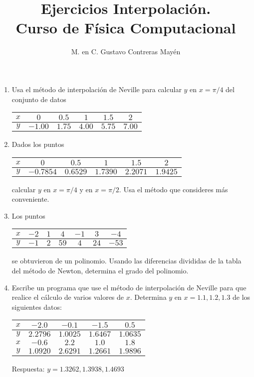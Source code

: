 \documentclass[11pt]{article}
\title{Ejercicios Interpolaci\'{o}n. \\ Curso de Física Computacional}
\author{M. en C. Gustavo Contreras Mayén}
\date{ }
\begin{document}
\maketitle
\fontsize{14}{14}\selectfont
\begin{enumerate}
\item Usa el m\'{e}todo de interpolaci\'{o}n de Neville para calcular $y$ en $x=\pi/4$ del conjunto de datos
\begin{table}[htbp]
\centering 
\begin{tabulary}{15cm}{c | c | c | c | c | c }
$x$ & $0$ & $0.5$ & $1$ & $1.5$ & $2$ \\
\midrule
$y$ & $-1.00$ & $1.75$ & $4.00$ & $5.75$ & $7.00$ 
\end{tabulary}
\end{table}
\item Dados los puntos
\begin{table}[htbp]
\centering 
\begin{tabulary}{15cm}{c | c | c | c | c | c }
$x$ & $0$ & $0.5$ & $1$ & $1.5$ & $2$ \\
\midrule
$y$ & $-0.7854$ & $0.6529$ & $1.7390$ & $2.2071$ & $1.9425$ 
\end{tabulary}
\end{table}
calcular $y$ en $x=\pi/4$ y en $x=\pi/2$. Usa el m\'{e}todo que consideres m\'{a}s conveniente.
\item Los puntos 
\begin{table}[htbp]
\centering 
\begin{tabulary}{15cm}{c | c | c | c | c | c | c |}
$x$ & $-2$ & $1$ & $4$ & $-1$ & $3$ & $-4$ \\
\midrule
$y$ & $-1$ & $2$ & $59$ & $4$ & $24$ & $-53$ 
\end{tabulary}
\end{table}
se obtuvieron de un polinomio. Usando las diferencias divididas de la tabla del m\'{e}todo de Newton, determina el grado del polinomio.
\item Escribe un programa que use el m\'{e}todo de interpolaci\'{o}n de Neville para que realice el c\'{a}lculo de varios valores de $x$. Determina $y$ en $x=1.1,1.2,1.3$ de los siguientes datos:
\begin{table}[htbp]
	\centering 
	\begin{tabulary}{15cm}{c | c | c | c | c |}
		$x$ & $-2.0$ & $-0.1$ & $-1.5$ & $0.5$  \\
		\midrule
		$y$ & $2.2796$ & $1.0025$ & $1.6467$ & $1.0635$ \\
		\midrule
		$x$ & $-0.6$ & $2.2$ & $1.0$ & $1.8$  \\
		\midrule
		$y$ & $1.0920$ & $2.6291$ & $1.2661$ & $1.9896$
	\end{tabulary}
\end{table}
Respuesta: $y=1.3262,1.3938,1.4693$
\end{enumerate}
\end{document}
